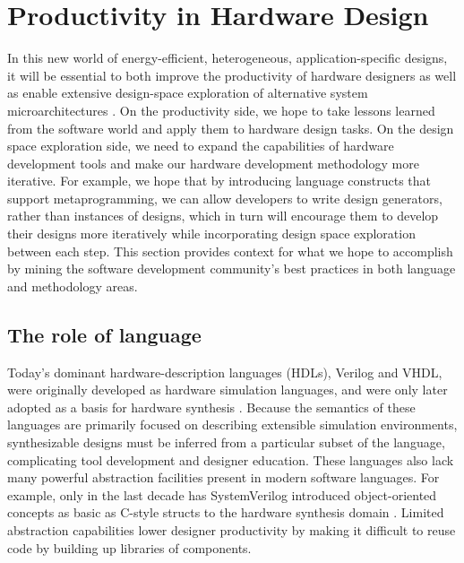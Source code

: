 \section{Productivity in Hardware Design}

In this new world of energy-efficient, heterogeneous, application-specific designs, it will be essential to both improve the productivity of hardware designers as well as enable extensive design-space exploration of alternative system microarchitectures \cite{shacham-micro10}.
On the productivity side, we hope to take lessons learned from the software world and apply them to hardware design tasks.
On the design space exploration side, we need to expand the capabilities of hardware development tools and make our hardware development methodology more iterative.
For example, we hope that by introducing language constructs that support metaprogramming, 
we can allow developers to write design generators, rather than instances of designs,
which in turn will encourage them to develop their designs more iteratively while
incorporating design space exploration between each step.
This section provides context for what we hope to accomplish by mining the software development community's best practices in both language and methodology areas.

\subsection{The role of language}

Today's dominant hardware-description languages (HDLs), Verilog and VHDL, were originally developed as hardware simulation languages,
and were only later adopted as a basis for hardware synthesis \cite{palnitkar2003verilog}.
Because the semantics of these languages are primarily focused on describing extensible simulation environments,
synthesizable designs must be inferred from a particular subset of the language, complicating tool development and designer education. 
These languages also lack many powerful abstraction facilities present in modern software languages.
For example, only in the last decade has SystemVerilog introduced object-oriented concepts as basic as C-style structs to the hardware synthesis domain \cite{sutherland2006systemverilog}.
Limited abstraction capabilities lower designer productivity by making it difficult to reuse code by building up libraries of components.

